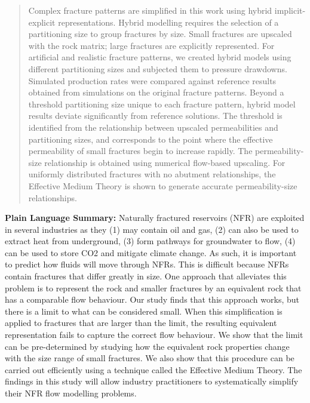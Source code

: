 \documentclass[draft]{agujournal2018}
\begin{document}
\begin{abstract}
Complex fracture patterns are simplified in this work using hybrid implicit-explicit representations. Hybrid modelling requires the selection of a partitioning size to group fractures by size. Small fractures are upscaled with the rock matrix; large fractures are explicitly represented. For artificial and realistic fracture patterns, we created hybrid models using different partitioning sizes and subjected them to pressure drawdowns. Simulated production rates were compared against reference results obtained from simulations on the original fracture patterns. Beyond a threshold partitioning size unique to each fracture pattern, hybrid model results deviate significantly from reference solutions. The threshold is identified from the relationship between upscaled permeabilities and partitioning sizes, and corresponds to the point where the effective permeability of small fractures begin to increase rapidly. The permeability-size relationship is obtained using numerical flow-based upscaling. For uniformly distributed fractures with no abutment relationships, the Effective Medium Theory is shown to generate accurate permeability-size relationships.

\end{abstract}

\textbf{Plain Language Summary:} Naturally fractured reservoirs (NFR) are exploited in several industries as they (1) may contain oil and gas, (2) can also be used to extract heat from underground, (3) form pathways for groundwater to flow, (4) can be used to store CO2 and mitigate climate change. As such, it is important to predict how fluids will move through NFRs. This is difficult because NFRs contain fractures that differ greatly in size. One approach that alleviates this problem is to represent the rock and smaller fractures by an equivalent rock that has a comparable flow behaviour. Our study finds that this approach works, but there is a limit to what can be considered small. When this simplification is applied to fractures that are larger than the limit, the resulting equivalent representation fails to capture the correct flow behaviour. We show that the limit can be pre-determined by studying how the equivalent rock properties change with the size range of small fractures. We also show that this procedure can be carried out efficiently using a technique called the Effective Medium Theory. The findings in this study will allow industry practitioners to systematically simplify their NFR flow modelling problems.
\end{document}
